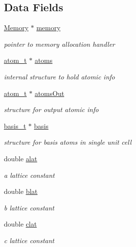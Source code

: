 \subsection*{Data Fields}
\begin{DoxyCompactItemize}
\item 
\hyperlink{class_memory}{Memory} $\ast$ \hyperlink{class_l_a_t_t_i_c_e_a4e8795a8cbd0a4594657a071fe68b9c3}{memory}
\begin{DoxyCompactList}\small\item\em pointer to memory allocation handler \end{DoxyCompactList}\item 
\hyperlink{structatom__t}{atom\+\_\+t} $\ast$ \hyperlink{class_l_a_t_t_i_c_e_aeb9f05d5a05013f9e39771004ee7a351}{atoms}
\begin{DoxyCompactList}\small\item\em internal structure to hold atomic info \end{DoxyCompactList}\item 
\hyperlink{structatom__t}{atom\+\_\+t} $\ast$ \hyperlink{class_l_a_t_t_i_c_e_a529b0104c83d19577c69688fa247238c}{atoms\+Out}
\begin{DoxyCompactList}\small\item\em structure for output atomic info \end{DoxyCompactList}\item 
\hyperlink{structbasis__t}{basis\+\_\+t} $\ast$ \hyperlink{class_l_a_t_t_i_c_e_a6af830d3ced50888840f85a837a730e1}{basis}
\begin{DoxyCompactList}\small\item\em structure for basis atoms in single unit cell \end{DoxyCompactList}\item 
double \hyperlink{class_l_a_t_t_i_c_e_a0b631e7b0ab66a25bf15fbf49d684f07}{alat}
\begin{DoxyCompactList}\small\item\em a lattice constant \end{DoxyCompactList}\item 
double \hyperlink{class_l_a_t_t_i_c_e_ae125b693205deca9ed500e9ece8c4f2d}{blat}
\begin{DoxyCompactList}\small\item\em b lattice constant \end{DoxyCompactList}\item 
double \hyperlink{class_l_a_t_t_i_c_e_aae495a347749c2380c73ecb89b955f3d}{clat}
\begin{DoxyCompactList}\small\item\em c lattice constant \end{DoxyCompactList}\item 

\end{DoxyCompactItemize}
